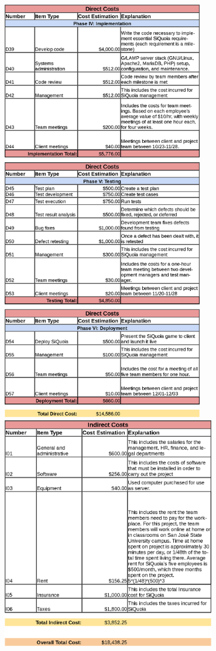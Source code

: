 \documentclass[12pt]{article}
\begin{document}
\begin{center}
\newpage
\includegraphics[width=0.66\textwidth]{chart2}
\newpage
\includegraphics[width=0.7\textwidth]{chart3}
\end{center}\\[2em]
\end{document}
